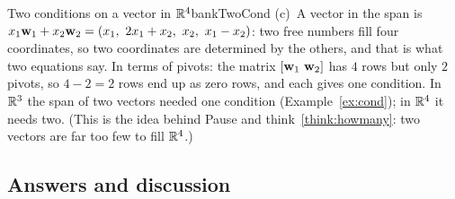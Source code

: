 \documentclass[11pt]{article}
\begin{document}
\begin{exmp}{Two conditions on a vector in $\mathbb{R}^4$}{bankTwoCond}
(c)~A vector in the span is $x_1\bv{w}_1+x_2\bv{w}_2=(x_1,\ 2x_1+x_2,\ x_2,\ x_1-x_2)$: two free numbers fill four coordinates, so two coordinates are determined by the others, and that is what two equations say. In terms of pivots: the matrix $[\mathbf{w}_1\ \mathbf{w}_2]$ has $4$ rows but only $2$ pivots, so $4-2=2$ rows end up as zero rows, and each gives one condition. In $\mathbb{R}^3$ the span of two vectors needed one condition (Example~\ref{ex:cond}); in $\mathbb{R}^4$ it needs two. (This is the idea behind Pause and think~\ref{think:howmany}: two vectors are far too few to fill $\mathbb{R}^4$.)
\end{exmp}

\subsection*{Answers and discussion}
\end{document}
